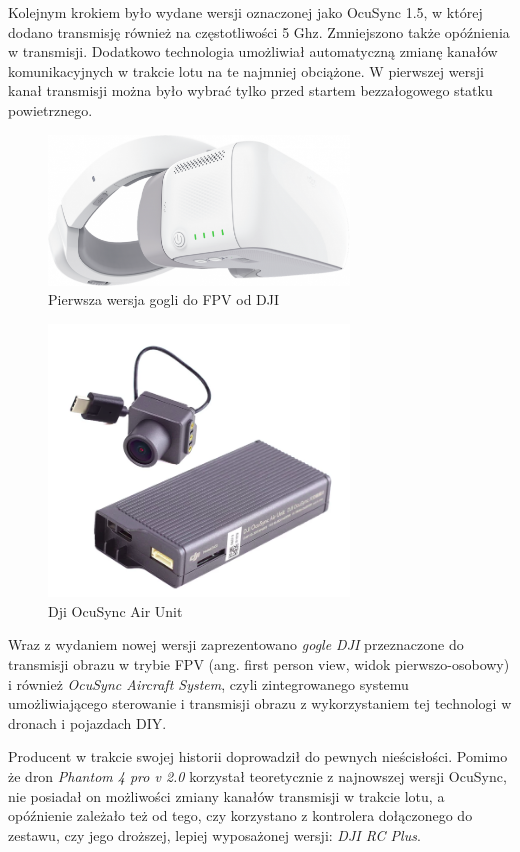 Kolejnym krokiem było wydane wersji oznaczonej jako OcuSync 1.5, w której dodano transmisję również na częstotliwości 5 Ghz. Zmniejszono także opóźnienia w transmisji. Dodatkowo technologia umożliwiał automatyczną zmianę kanałów komunikacyjnych w trakcie lotu na te najmniej obciążone. W pierwszej wersji kanał
transmisji można było wybrać tylko przed startem bezzałogowego statku powietrznego.\cite{ocusync-yt}


\begin{figure}[!ht]
  \centering
  \includegraphics[width=8cm]{./Obrazy/dji-google.png}
  \caption{Pierwsza wersja gogli do FPV od DJI}
  \end{figure}
  

\begin{figure}[!ht]
  \centering
  \includegraphics[width=8cm]{./Obrazy/dji-air-unit.png}
  \caption{Dji OcuSync Air Unit}
  \end{figure}

Wraz z wydaniem nowej wersji zaprezentowano \textit{gogle DJI} przeznaczone do transmisji obrazu w trybie FPV (ang. first person view, widok pierwszo-osobowy) i również \textit{OcuSync Aircraft System}, czyli zintegrowanego systemu umożliwiającego sterowanie i transmisji obrazu z wykorzystaniem tej technologi w dronach i pojazdach DIY.

Producent w trakcie swojej historii doprowadził do pewnych nieścisłości. Pomimo że dron \textit{Phantom 4 pro v 2.0} korzystał teoretycznie z najnowszej wersji OcuSync, nie posiadał on możliwości zmiany kanałów transmisji w trakcie lotu, a opóźnienie zależało też od tego, czy korzystano z kontrolera dołączonego do zestawu, czy jego droższej, lepiej wyposażonej wersji: \textit{DJI RC Plus}.
  

